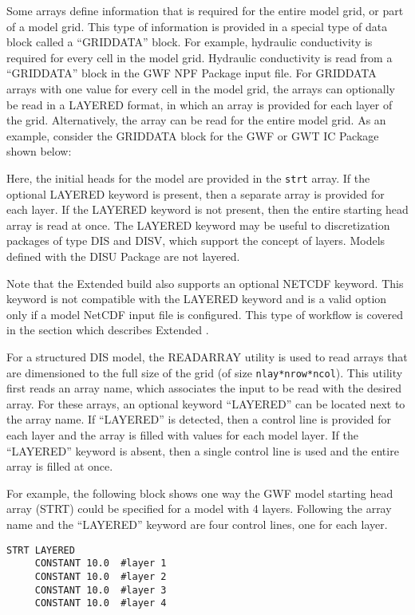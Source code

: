 Some arrays define information that is required for the entire model grid, or part of a model grid.  This type of information is provided in a special type of data block called a ``GRIDDATA'' block.  For example, hydraulic conductivity is required for every cell in the model grid.  Hydraulic conductivity is read from a ``GRIDDATA'' block in the \mf GWF NPF Package input file.  For GRIDDATA arrays with one value for every cell in the model grid, the arrays can optionally be read in a LAYERED format, in which an array is provided for each layer of the grid.  Alternatively, the array can be read for the entire model grid.  As an example, consider the GRIDDATA block for the \mf GWF or GWT IC Package shown below:



Here, the initial heads for the model are provided in the \texttt{strt} array.  If the optional LAYERED keyword is present, then a separate array is provided for each layer.  If the LAYERED keyword is not present, then the entire starting head array is read at once.  The LAYERED keyword may be useful to discretization packages of type DIS and DISV, which support the concept of layers.  Models defined with the DISU Package are not layered.

Note that the \mf Extended build also supports an optional NETCDF keyword.  This keyword is not compatible with the LAYERED keyword and is a valid option only if a model NetCDF input file is configured.  This type of workflow is covered in the section which describes Extended \mf.

For a structured DIS model, the READARRAY utility is used to read arrays that are dimensioned to the full size of the grid (of size \texttt{nlay*nrow*ncol}). This utility first reads an array name, which associates the input to be read with the desired array.  For these arrays, an optional keyword ``LAYERED'' can be located next to the array name.  If ``LAYERED'' is detected, then a control line is provided for each layer and the array is filled with values for each model layer.  If the ``LAYERED'' keyword is absent, then a single control line is used and the entire array is filled at once.

For example, the following block shows one way the \mf GWF model starting head array (STRT) could be specified for a model with 4 layers.  Following the array name and the ``LAYERED'' keyword are four control lines, one for each layer.

\begin{lstlisting}[style=inputfile]
  STRT LAYERED
     CONSTANT 10.0  #layer 1
     CONSTANT 10.0  #layer 2
     CONSTANT 10.0  #layer 3
     CONSTANT 10.0  #layer 4
\end{lstlisting}

